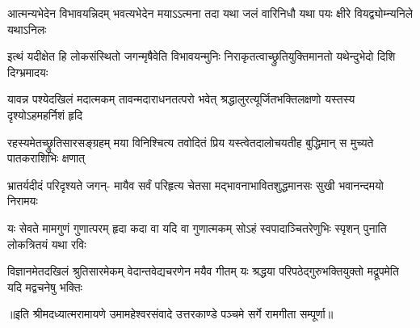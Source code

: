 \fourlineindentedshloka
{आत्मन्यभेदेन विभावयन्निदम्}
{भवत्यभेदेन मयाऽऽत्मना तदा}
{यथा जलं वारिनिधौ यथा पयः}
{क्षीरे वियद्व्योम्न्यनिले यथाऽनिलः} %

\fourlineindentedshloka
{इत्थं यदीक्षेत हि लोकसंस्थितो}
{जगन्मृषैवेति विभावयन्मुनिः}
{निराकृतत्वाच्छ्रुतियुक्तिमानतो}
{यथेन्दुभेदो दिशि दिग्भ्रमादयः} %

\fourlineindentedshloka
{यावन्न पश्येदखिलं मदात्मकम्}
{तावन्मदाराधनतत्परो भवेत्}
{श्रद्धालुरत्यूर्जितभक्तिलक्षणो}
{यस्तस्य दृश्योऽहमहर्निशं हृदि} %

\fourlineindentedshloka
{रहस्यमेतच्छ्रुतिसारसङ्ग्रहम्}
{मया विनिश्चित्य तवोदितं प्रिय}
{यस्त्वेतदालोचयतीह बुद्धिमान्}
{स मुच्यते पातकराशिभिः क्षणात्} %

\fourlineindentedshloka
{भ्रातर्यदीदं परिदृश्यते जगन्-}
{मायैव सर्वं परिहृत्य चेतसा}
{मद्भावनाभावितशुद्धमानसः}
{सुखी भवानन्दमयो निरामयः} %

\fourlineindentedshloka
{यः सेवते मामगुणं गुणात्परम्}
{हृदा कदा वा यदि वा गुणात्मकम्}
{सोऽहं स्वपादाञ्चितरेणुभिः स्पृशन्}
{पुनाति लोकत्रितयं यथा रविः} %

\fourlineindentedshloka
{विज्ञानमेतदखिलं श्रुतिसारमेकम्}
{वेदान्तवेद्यचरणेन मयैव गीतम्}
{यः श्रद्धया परिपठेद्गुरुभक्तियुक्तो}
{मद्रूपमेति यदि मद्वचनेषु भक्तिः} %

{॥इति श्रीमदध्यात्मरामायणे उमामहेश्वरसंवादे उत्तरकाण्डे पञ्चमे  सर्गे 
रामगीता सम्पूर्णा॥}
